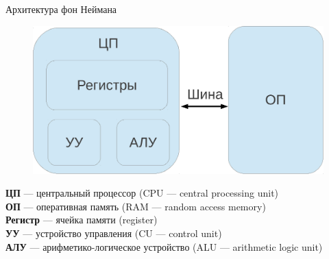 \documentclass{beamer}
\begin{document}
    \subsection{}
    \begin{frame}{Архитектура фон Неймана}
        \transdissolve
        \begin{figure}
            \centering
            \includegraphics[width=0.8\linewidth]{fig/arch.pdf} 
        \end{figure}
        {\bf ЦП} --- центральный процессор (CPU --- central processing unit) \\
        {\bf ОП} --- оперативная память (RAM --- random access memory) \\
        {\bf Регистр} --- ячейка памяти (register)\\
        {\bf УУ} --- устройство управления (CU --- control unit)\\
        {\bf АЛУ} --- арифметико-логическое устройство (ALU --- arithmetic logic unit)\\
    \end{frame}
\end{document}
